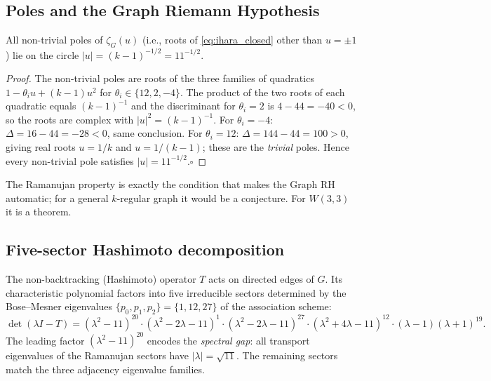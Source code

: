 \subsection{Poles and the Graph Riemann Hypothesis}
\label{sec:zeta_grh}

\begin{theorem}
  All non-trivial poles of $\zeta_G(u)$ (i.e., roots of \eqref{eq:ihara_closed}
  other than $u = \pm 1$) lie on the circle $|u| = (k-1)^{-1/2} = 11^{-1/2}$.
\end{theorem}

\begin{proof}
  The non-trivial poles are roots of the three families of quadratics
  $1 - \theta_i u + (k-1)u^2$ for $\theta_i \in \{12,2,-4\}$.
  The product of the two roots of each quadratic equals $(k-1)^{-1}$
  and the discriminant for $\theta_i = 2$ is $4 - 44 = -40 < 0$, so the
  roots are complex with $|u|^2 = (k-1)^{-1}$.  For $\theta_i = -4$:
  $\Delta = 16 - 44 = -28 < 0$, same conclusion.  For $\theta_i = 12$:
  $\Delta = 144 - 44 = 100 > 0$, giving real roots $u = 1/k$ and $u = 1/(k-1)$;
  these are the \emph{trivial} poles.  Hence every non-trivial pole satisfies
  $|u| = 11^{-1/2}$.\hfill$\square$
\end{proof}

The Ramanujan property is exactly the condition that makes the Graph RH
automatic; for a general $k$-regular graph it would be a conjecture.
For $W(3,3)$ it is a theorem.

\subsection{Five-sector Hashimoto decomposition}
\label{sec:zeta_hashimoto}

The non-backtracking (Hashimoto) operator $T$ acts on directed edges of $G$.
Its characteristic polynomial factors into five irreducible sectors determined
by the Bose--Mesner eigenvalues $\{p_0, p_1, p_2\} = \{1, 12, 27\}$ of the
association scheme:
\begin{equation}
  \det(\lambda I - T) =
  (\lambda^2 - 11)^{20}\cdot
  (\lambda^2 - 2\lambda - 11)^{1}\cdot
  (\lambda^2 - 2\lambda - 11)^{27}\cdot
  (\lambda^2 + 4\lambda - 11)^{12}\cdot
  (\lambda - 1)(\lambda + 1)^{19}.
  \label{eq:hashimoto_5sector}
\end{equation}
The leading factor $(\lambda^2-11)^{20}$ encodes the \emph{spectral gap}:
all transport eigenvalues of the Ramanujan sectors have $|\lambda|=\sqrt{11}$.
The remaining sectors match the three adjacency eigenvalue families.

